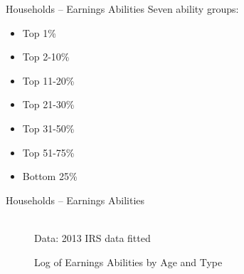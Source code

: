 \documentclass{beamer}
\begin{document}
  \begin{frame}{Households -- Earnings Abilities}
      Seven ability groups:
      \begin{itemize}
      \item Top 1\%
      \item Top 2-10\%
      \item Top 11-20\%
      \item Top 21-30\%
      \item Top 31-50\%
      \item Top 51-75\%
      \item Bottom 25\%
      \end{itemize}
  \end{frame}

  \begin{frame}{Households -- Earnings Abilities}
      \begin{figure}[htb]\centering
         \caption{Log of Earnings Abilities by Age and Type}
          \\
         \tiny{Data: 2013 IRS data fitted}
      \end{figure}
  \end{frame}
\end{document}
